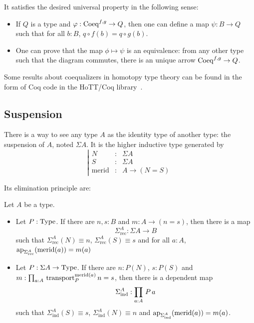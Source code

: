 It satisfies the desired universal property in the following sense:
\begin{itemize}
\item If $Q$ is a type and $\varphi:\mathrm{Coeq}^{f,g} \to Q$, then one can
  define a map $\psi:B\to Q$ such that for all $b:B$, $q\circ f(b) =
  q\circ g(b)$.
\item One can prove that the map $\phi \mapsto \psi$ is an
  equivalence: from any other type such that the diagram commutes,
  there is an unique arrow $\mathrm{Coeq}^{f,g} \to Q$.
\end{itemize}

Some results about coequalizers in homotopy type theory can be found
in the form of Coq code in the HoTT/Coq library~\cite{hottlib}.

\subsection{Suspension}
\label{ssec:susp}

There is a way to see any type $A$ as the identity type of another
type: the suspension of $A$, noted $\Sigma A$. It is the higher inductive type generated
by
\newcommand{\merid}{\mathrm{merid}}
\[ \left|
    \begin{array}{lll}
      N&:& \Sigma A \\
      S&:& \Sigma A\\
      \merid&:& A \to (N = S)
    \end{array}
\right. \]

Its elimination principle are:
\begin{lem}
  Let $A$ be a type.
  \begin{itemize}
  \item Let $P:\operatorname{Type}$. If there are $n,s:B$ and $m:A\to (n=s)$, then
    there is a map
    \[\Sigma^A_{\mathrm{rec}} : \Sigma A \to B\]
    such that $\Sigma^A_{\mathrm{rec}}(N) \equiv n$,
    $\Sigma^A_{\mathrm{rec}}(S)\equiv s$ and for all $a:A$,
    $\ap{\Sigma^A_{\mathrm{rec}}}(\merid(a)) = m(a)$
  \item Let $P:\Sigma A\to \operatorname{Type}$. If there are $n:P(N)$, $s:P(S)$ and
    $m:\prodD a A {\transport_P^{\merid(a)} n = s}$, then there is a
    dependent map
    \[ \Sigma^A_{\mathrm{ind}} : \prod_{a:A}\, P\, a\]
    such that $\Sigma^A_{\mathrm{ind}}(S) \equiv s$,
    $\Sigma^A_{\mathrm{ind}}(N)\equiv n$ and
    $\ap{\Sigma^A_{\mathrm{ind}}}(\merid(a)) = m(a)$.
  \end{itemize}
\end{lem}


